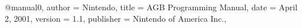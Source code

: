 
	@manual{0,
		author = {Nintendo},
		title = {AGB Programming Manual},
		date = {April 2, 2001},
		version = {1.1},
		publisher = {Nintendo of America Inc.},
	}